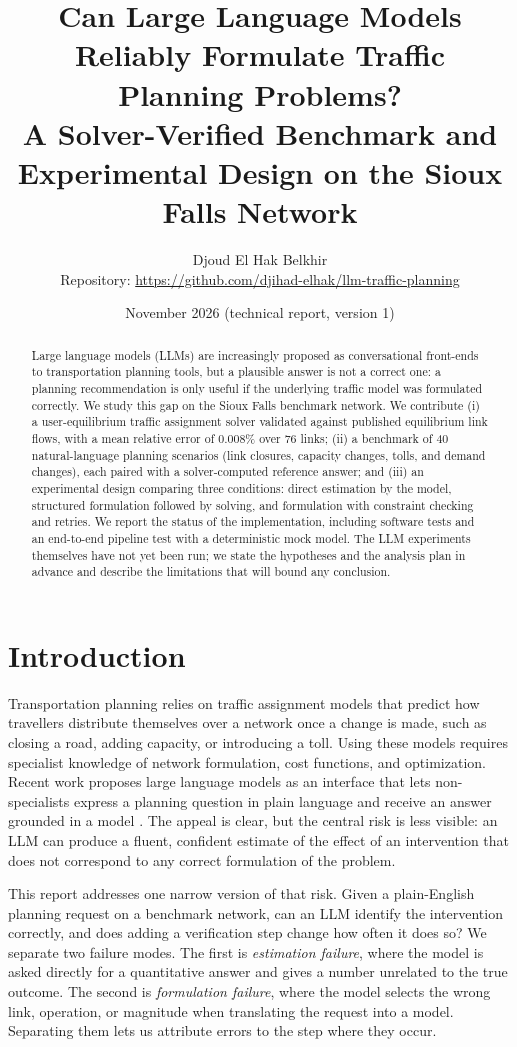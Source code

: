 \documentclass[11pt,a4paper]{article}
\title{\textbf{Can Large Language Models Reliably Formulate Traffic Planning Problems?}\\[0.4em]
\large A Solver-Verified Benchmark and Experimental Design on the Sioux Falls Network}
\author{Djoud El Hak Belkhir\\[0.2em]\small Repository: \url{https://github.com/djihad-elhak/llm-traffic-planning}}
\date{November 2026 \quad (technical report, version 1)}
\begin{document}
\maketitle

\begin{abstract}
Large language models (LLMs) are increasingly proposed as conversational front-ends to transportation planning tools, but a plausible answer is not a correct one: a planning recommendation is only useful if the underlying traffic model was formulated correctly. We study this gap on the Sioux Falls benchmark network. We contribute (i) a user-equilibrium traffic assignment solver validated against published equilibrium link flows, with a mean relative error of 0.008\% over 76 links; (ii) a benchmark of 40 natural-language planning scenarios (link closures, capacity changes, tolls, and demand changes), each paired with a solver-computed reference answer; and (iii) an experimental design comparing three conditions: direct estimation by the model, structured formulation followed by solving, and formulation with constraint checking and retries. We report the status of the implementation, including software tests and an end-to-end pipeline test with a deterministic mock model. The LLM experiments themselves have not yet been run; we state the hypotheses and the analysis plan in advance and describe the limitations that will bound any conclusion.
\end{abstract}

\section{Introduction}
Transportation planning relies on traffic assignment models that predict how travellers distribute themselves over a network once a change is made, such as closing a road, adding capacity, or introducing a toll. Using these models requires specialist knowledge of network formulation, cost functions, and optimization. Recent work proposes large language models as an interface that lets non-specialists express a planning question in plain language and receive an answer grounded in a model \cite{lee2026}. The appeal is clear, but the central risk is less visible: an LLM can produce a fluent, confident estimate of the effect of an intervention that does not correspond to any correct formulation of the problem.

This report addresses one narrow version of that risk. Given a plain-English planning request on a benchmark network, can an LLM identify the intervention correctly, and does adding a verification step change how often it does so? We separate two failure modes. The first is \emph{estimation failure}, where the model is asked directly for a quantitative answer and gives a number unrelated to the true outcome. The second is \emph{formulation failure}, where the model selects the wrong link, operation, or magnitude when translating the request into a model. Separating them lets us attribute errors to the step where they occur.
\end{document}
